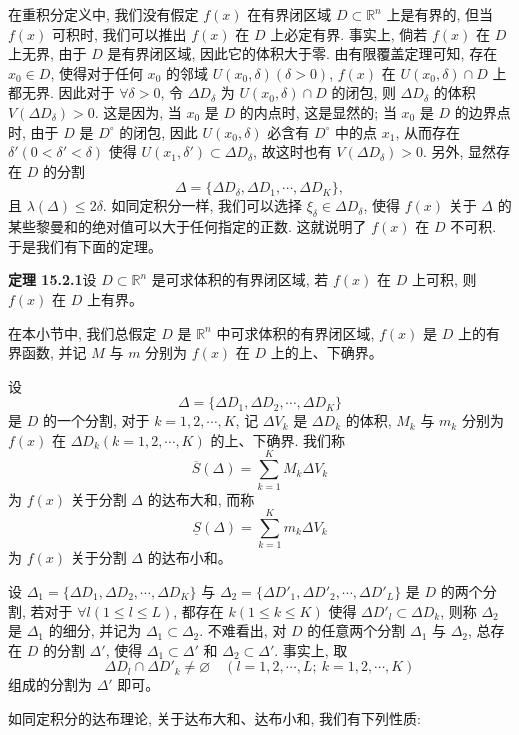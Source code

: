 \documentclass[UTF8,12pt,a4paper,fontset=fandol]{ctexart}
\begin{document}
在重积分定义中, 我们没有假定 $f(x)$ 在有界闭区域 $D\subset\mathbb R^n$ 上是有界的, 但当 $f(x)$ 可积时, 我们可以推出 $f(x)$ 在 $D$ 上必定有界. 事实上, 倘若 $f(x)$ 在 $D$ 上无界, 由于 $D$ 是有界闭区域, 因此它的体积大于零. 由有限覆盖定理可知, 存在 $x_0\in D$, 使得对于任何 $x_0$ 的邻域 $U(x_0,\delta)(\delta>0)$, $f(x)$ 在 $U(x_0,\delta)\cap D$ 上都无界. 因此对于 $\forall\delta>0$, 令 $\Delta D_\delta$ 为 $U(x_0,\delta)\cap D$ 的闭包, 则 $\Delta D_\delta$ 的体积 $V(\Delta D_\delta)>0$. 这是因为, 当 $x_0$ 是 $D$ 的内点时, 这是显然的; 当 $x_0$ 是 $D$ 的边界点时, 由于 $D$ 是 $D^\circ$ 的闭包, 因此 $U(x_0,\delta)$ 必含有 $D^\circ$ 中的点 $x_1$, 从而存在 $\delta'(0<\delta'<\delta)$ 使得 $U(x_1,\delta')\subset\Delta D_\delta$, 故这时也有 $V(\Delta D_\delta)>0$. 另外, 显然存在 $D$ 的分割
\[
  \Delta=\{\Delta D_\delta,\Delta D_1,\cdots,\Delta D_K\},
\]
且 $\lambda(\Delta)\leqslant2\delta$. 如同定积分一样, 我们可以选择 $\xi_\delta\in\Delta D_\delta$, 使得 $f(x)$ 关于 $\Delta$ 的某些黎曼和的绝对值可以大于任何指定的正数. 这就说明了 $f(x)$ 在 $D$ 不可积. 于是我们有下面的定理。

\noindent\textbf{定理 15.2.1}\quad 设 $D\subset\mathbb R^n$ 是可求体积的有界闭区域, 若 $f(x)$ 在 $D$ 上可积, 则 $f(x)$ 在 $D$ 上有界。

在本小节中, 我们总假定 $D$ 是 $\mathbb R^n$ 中可求体积的有界闭区域, $f(x)$ 是 $D$ 上的有界函数, 并记 $M$ 与 $m$ 分别为 $f(x)$ 在 $D$ 上的上、下确界。

设
\[
  \Delta=\{\Delta D_1,\Delta D_2,\cdots,\Delta D_K\}
\]
是 $D$ 的一个分割, 对于 $k=1,2,\cdots,K$, 记 $\Delta V_k$ 是 $\Delta D_k$ 的体积, $M_k$ 与 $m_k$ 分别为 $f(x)$ 在 $\Delta D_k(k=1,2,\cdots,K)$ 的上、下确界. 我们称
\[
  \overline S(\Delta)=\sum_{k=1}^K M_k\Delta V_k
\]
为 $f(x)$ 关于分割 $\Delta$ 的达布大和, 而称
\[
  \underline S(\Delta)=\sum_{k=1}^K m_k\Delta V_k
\]
为 $f(x)$ 关于分割 $\Delta$ 的达布小和。

设 $\Delta_1=\{\Delta D_1,\Delta D_2,\cdots,\Delta D_K\}$ 与 $\Delta_2=\{\Delta D'_1,\Delta D'_2,\cdots,\Delta D'_L\}$ 是 $D$ 的两个分割, 若对于 $\forall l(1\leqslant l\leqslant L)$, 都存在 $k(1\leqslant k\leqslant K)$ 使得 $\Delta D'_l\subset\Delta D_k$, 则称 $\Delta_2$ 是 $\Delta_1$ 的细分, 并记为 $\Delta_1\subset\Delta_2$. 不难看出, 对 $D$ 的任意两个分割 $\Delta_1$ 与 $\Delta_2$, 总存在 $D$ 的分割 $\Delta'$, 使得 $\Delta_1\subset\Delta'$ 和 $\Delta_2\subset\Delta'$. 事实上, 取
\[
  \Delta D_l\cap\Delta D'_k\ne\varnothing\quad (l=1,2,\cdots,L;\ k=1,2,\cdots,K)
\]
组成的分割为 $\Delta'$ 即可。

如同定积分的达布理论, 关于达布大和、达布小和, 我们有下列性质:
\end{document}
